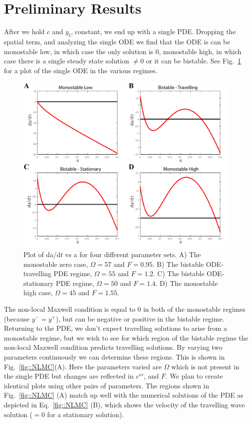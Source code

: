 \section{Preliminary Results}


After we hold $c$ and $y_C$ constant, we end up with a single PDE. Dropping the spatial term, and analyzing the single ODE we find that the ODE is can be monostable low, in which case the only solution is $0$, monostable high, in which case there is a single steady state solution $\ne 0$ or it can be bistable. See Fig.~\ref{fig::phaseline} for a plot of the single ODE in the various regimes. 
\begin{figure}[h]
\centering
\captionsetup{width=0.9\linewidth}
\includegraphics[width=4.5in]{Project2/figs/phaseline.pdf}
\caption{Plot of da/d$t$ vs a for four different parameter sets. A) The monostable zero case, $\Omega = 57$ and $F = 0.95$. B) The bistable ODE-travelling PDE regime, $\Omega = 55$ and $F = 1.2$. C) The  bistable ODE-stationary PDE regime, $\Omega =50 $ and $F = 1.4$. D) The monostable high case,  $\Omega = 45$ and $F = 1.55$.}
\label{fig::phaseline}
\end{figure}

\hspace{6pt}

The non-local Maxwell condition is equal to $0$ in both of the monostable regimes (because $y^- = y^+$), but can be negative or positive in the bistable regime. Returning to the PDE, we don't expect travelling solutions to arise from a monostable regime, but we wish to see for which region of the bistable regime the non-local Maxwell condition predicts travelling solutions. By varying two parameters continuously we can determine these regions. This is shown in Fig.~\ref{fig::NLMC}(A). Here the parameters varied are $\Omega$ which is not present in the single PDE but changes are reflected in $c^{ss}$, and $F$. We plan to create identical plots using other pairs of parameters. The regions shown in Fig.~\ref{fig::NLMC} (A) match up well with the numerical solutions of the PDE as depicted in Eq.~\ref{fig::NLMC} (B), which shows the velocity of the travelling wave solution ($=0$ for a stationary solution).


